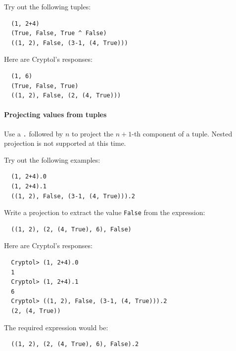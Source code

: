 
\begin{Exercise}\label{ex:tup:1}
Try out the following tuples:
\begin{Verbatim}
  (1, 2+4)
  (True, False, True ^ False)
  ((1, 2), False, (3-1, (4, True)))
\end{Verbatim}
\end{Exercise}
\begin{Answer}
Here are Cryptol's responses:
\begin{Verbatim}
  (1, 6)
  (True, False, True)
  ((1, 2), False, (2, (4, True)))
\end{Verbatim}
\end{Answer}


\paragraph*{Projecting values from tuples} Use a {\tt .} followed by
$n$ to project the $n+1$-th component of a tuple.  Nested projection is
not supported at this time.

\begin{Exercise}\label{ex:tup:2}
Try out the following examples:
\begin{Verbatim}
  (1, 2+4).0
  (1, 2+4).1
  ((1, 2), False, (3-1, (4, True))).2
\end{Verbatim}
  Write a
projection to extract the value {\tt False} from the expression:
\begin{Verbatim}
  ((1, 2), (2, (4, True), 6), False)
\end{Verbatim}
\end{Exercise}
\begin{Answer}
Here are Cryptol's responses:
\begin{Verbatim}
  Cryptol> (1, 2+4).0
  1
  Cryptol> (1, 2+4).1
  6
  Cryptol> ((1, 2), False, (3-1, (4, True))).2
  (2, (4, True))
\end{Verbatim}
The required expression would be:
\begin{Verbatim}
  ((1, 2), (2, (4, True), 6), False).2
\end{Verbatim}
\end{Answer}

